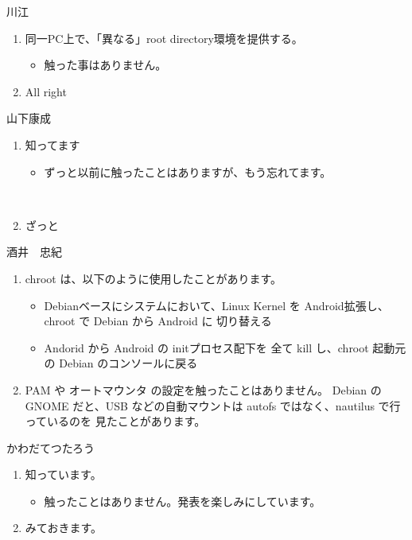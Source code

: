 \documentclass[mingoth,a4paper]{jsarticle}
\begin{document}
\begin{prework}{ 川江 }
 \begin{enumerate}
  \item 同一PC上で、「異なる」root directory環境を提供する。
        \begin{itemize}
         \item 触った事はありません。
        \end{itemize}
  \item All right
 \end{enumerate}
\end{prework}

\begin{prework}{ 山下康成 }
 \begin{enumerate}
  \item 知ってます
        \begin{itemize}
         \item ずっと以前に触ったことはありますが、もう忘れてます。
        \end{itemize}　
  \item ざっと
 \end{enumerate}
\end{prework}

\begin{prework}{ 酒井　忠紀 }
 \begin{enumerate}
  \item chroot は、以下のように使用したことがあります。
        \begin{itemize}
         \item Debianベースにシステムにおいて、Linux Kernel を
               Android拡張し、chroot で Debian から Android に
               切り替える
         \item Andorid から Android の initプロセス配下を
               全て kill し、chroot 起動元の Debian のコンソールに戻る
        \end{itemize}
  \item PAM や オートマウンタ の設定を触ったことはありません。
        Debian の GNOME だと、USB などの自動マウントは
        autofs ではなく、nautilus で行っているのを
        見たことがあります。
 \end{enumerate}
\end{prework}

\begin{prework}{ かわだてつたろう }
 \begin{enumerate}
  \item 知っています。
        \begin{itemize}
         \item 触ったことはありません。発表を楽しみにしています。
        \end{itemize} 
  \item みておきます。
 \end{enumerate}
\end{prework}
\end{document}
